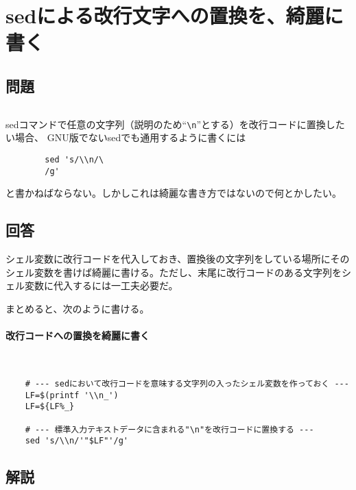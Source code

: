 \section{sedによる改行文字への置換を、綺麗に書く}
\label{recipe:sed_LF}

\subsection*{問題}
\noindent
$\!\!\!\!\!$
\begin{grshfboxit}{160.0mm}
	sedコマンドで任意の文字列（説明のため``\verb|\n|''とする）を改行コードに置換したい場合、
	GNU版でないsedでも通用するように書くには
	\begin{verbatim}
		sed 's/\\n/\
		/g'
	\end{verbatim}
	と書かねばならない。しかしこれは綺麗な書き方ではないので何とかしたい。
\end{grshfboxit}

\subsection*{回答}
シェル変数に改行コードを代入しておき、置換後の文字列をしている場所にそのシェル変数を書けば綺麗に書ける。ただし、末尾に改行コードのある文字列をシェル変数に代入するには一工夫必要だ。

まとめると、次のように書ける。
\paragraph{改行コードへの置換を綺麗に書く} 　\\
\begin{frameboxit}{160.0mm}
\begin{verbatim}
	# --- sedにおいて改行コードを意味する文字列の入ったシェル変数を作っておく ---
	LF=$(printf '\\n_')
	LF=${LF%_}

	# --- 標準入力テキストデータに含まれる"\n"を改行コードに置換する ---
	sed 's/\\n/'"$LF"'/g'
\end{verbatim}
\end{frameboxit}

\subsection*{解説}

